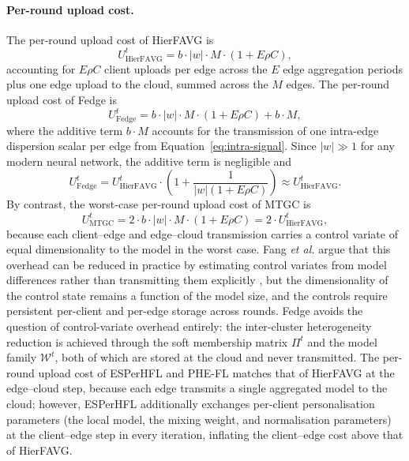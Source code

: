 \paragraph{Per-round upload cost.}
The per-round upload cost of HierFAVG is
\begin{equation}
\label{eq:cost-hierfavg-up}
U_{\text{HierFAVG}}^{t} = b \cdot |w| \cdot M \cdot \left( 1 + E \rho C \right),
\end{equation}
accounting for $E \rho C$ client uploads per edge across the $E$ edge aggregation periods plus one edge upload to the cloud, summed across the $M$ edges. The per-round upload cost of Fedge is
\begin{equation}
\label{eq:cost-fedge-up}
U_{\text{Fedge}}^{t} = b \cdot |w| \cdot M \cdot \left( 1 + E \rho C \right) + b \cdot M,
\end{equation}
where the additive term $b \cdot M$ accounts for the transmission of one intra-edge dispersion scalar per edge from Equation~\eqref{eq:intra-signal}. Since $|w| \gg 1$ for any modern neural network, the additive term is negligible and
\begin{equation}
\label{eq:cost-fedge-approx}
U_{\text{Fedge}}^{t} = U_{\text{HierFAVG}}^{t} \cdot \left( 1 + \frac{1}{|w| \left(1 + E \rho C\right)} \right) \approx U_{\text{HierFAVG}}^{t}.
\end{equation}
By contrast, the worst-case per-round upload cost of MTGC is
\begin{equation}
\label{eq:cost-mtgc-up}
U_{\text{MTGC}}^{t} = 2 \cdot b \cdot |w| \cdot M \cdot \left( 1 + E \rho C \right) = 2 \cdot U_{\text{HierFAVG}}^{t},
\end{equation}
because each client--edge and edge--cloud transmission carries a control variate of equal dimensionality to the model in the worst case. Fang \emph{et al.} argue that this overhead can be reduced in practice by estimating control variates from model differences rather than transmitting them explicitly \cite{fang2024hierarchical}, but the dimensionality of the control state remains a function of the model size, and the controls require persistent per-client and per-edge storage across rounds. Fedge avoids the question of control-variate overhead entirely: the inter-cluster heterogeneity reduction is achieved through the soft membership matrix $\Pi^{t}$ and the model family $\mathcal{W}^{t}$, both of which are stored at the cloud and never transmitted. The per-round upload cost of ESPerHFL \cite{ma2024personalized} and PHE-FL \cite{lee2025phefl} matches that of HierFAVG at the edge--cloud step, because each edge transmits a single aggregated model to the cloud; however, ESPerHFL additionally exchanges per-client personalisation parameters (the local model, the mixing weight, and normalisation parameters) at the client--edge step in every iteration, inflating the client--edge cost above that of HierFAVG.

